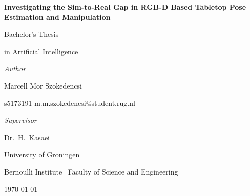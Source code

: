 \documentclass[10pt,a4paper,twocolumn]{article}
\begin{document}
\begin{titlepage}
\centering
\vspace*{2.3cm}
{\Huge\bfseries Investigating the Sim-to-Real Gap in RGB-D Based Tabletop Pose Estimation and Manipulation\par}
\vspace{1.3cm}
{\Large Bachelor's Thesis\par}
\vspace{0.25cm}
{\large in Artificial Intelligence\par}
\vspace{2.6cm}
{\large\itshape Author\par}
\vspace{0.2cm}
{\Large Marcell Mor Szokedencsi\par}
\vspace{0.15cm}
{\large s5173191 \quad m.m.szokedencsi@student.rug.nl\par}
\vspace{1.6cm}
{\large\itshape Supervisor\par}
\vspace{0.2cm}
{\Large Dr.\ H.\ Kasaei\par}
\vfill
{\large University of Groningen\par}
\vspace{0.15cm}
{\large Bernoulli Institute \textemdash\ Faculty of Science and Engineering\par}
\vspace{0.9cm}
{\large \today\par}
\end{titlepage}
\end{document}
